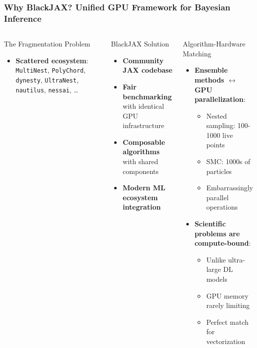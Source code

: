 \documentclass[aspectratio=169]{beamer}
\begin{document}
\begin{frame}
    \frametitle{Why BlackJAX? Unified GPU Framework for Bayesian Inference}
    \begin{columns}
        \begin{block}{The Fragmentation Problem}
            \begin{itemize}
                \item \textbf{Scattered ecosystem}:
                    \texttt{MultiNest}, \texttt{PolyChord}, \texttt{dynesty}, \texttt{UltraNest}, \texttt{nautilus}, \texttt{nessai}, \ldots
            \end{itemize}
        \end{block}
        \begin{block}{BlackJAX Solution}
            \begin{itemize}
                \item \textbf{Community JAX codebase}
                \item \textbf{Fair benchmarking} with identical GPU infrastructure
                \item \textbf{Composable algorithms} with shared components
                \item \textbf{Modern ML ecosystem integration}
            \end{itemize}
        \end{block}
        \begin{block}{Algorithm-Hardware Matching}
            \begin{itemize}
                \item \textbf{Ensemble methods $\leftrightarrow$ GPU parallelization}:
                    \begin{itemize}
                        \item Nested sampling: 100-1000 live points
                        \item SMC: 1000s of particles
                        \item Embarrassingly parallel operations
                    \end{itemize}
                \item \textbf{Scientific problems are compute-bound}:
                    \begin{itemize}
                        \item Unlike ultra-large DL models
                        \item GPU memory rarely limiting
                        \item Perfect match for vectorization
                    \end{itemize}
            \end{itemize}
        \end{block}
    \end{columns}
\end{frame}
\end{document}
